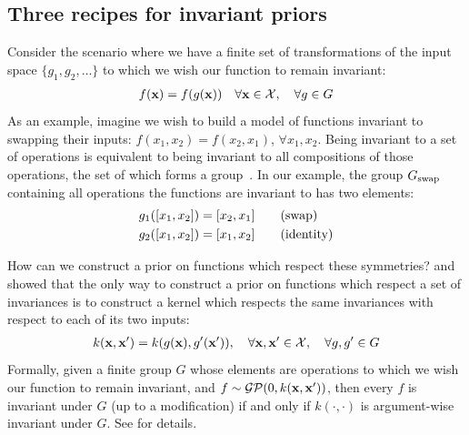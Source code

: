\subsection{Three recipes for invariant priors}

Consider the scenario where we have a finite set of transformations of the input space $\{g_1, g_2, \ldots \}$ to which we wish our function to remain invariant:
%
\begin{align}
f({\bf{x}}) = f(g({\bf{x}}))  \quad \forall {\bf{x}} \in \mathcal{X}, \quad \forall g \in G
\end{align}
%
As an example, imagine we wish to build a model of functions invariant to swapping their inputs: $f(x_1, x_2) = f(x_2, x_1)$, $\forall x_1,x_2$.
Being invariant to a set of operations is equivalent to being invariant to all compositions of those operations, the set of which forms a group~\citep[chapter 21]{armstrong1988groups}.
In our example, the group $G_\textnormal{swap}$ containing all operations the functions are invariant to has two elements:%
%
\begin{align}
g_1([x_1, x_2]) & = [x_2, x_1] \qquad \textnormal{(swap)} \\
g_2([x_1, x_2]) & = [x_1, x_2] \qquad \textnormal{(identity)}
\end{align}


How can we construct a prior on functions which respect these symmetries?
\citet{ginsbourger2012argumentwise} and \citet{Invariances13} showed that the only way to construct a \gp{} prior on functions which respect a set of invariances is to construct a kernel which respects the same invariances with respect to each of its two inputs:
%
\begin{align}
k({\bf{x}}, {\bf{x}}') = k( g({\bf{x}}), g'({\bf{x}}')), \quad \forall {\bf{x}}, {\bf{x}}' \in \mathcal{X}, \quad \forall g, g' \in G
\end{align}
%
Formally, given a finite group $G$ whose elements are operations to which we wish our function to remain invariant, and $f \sim \mathcal{GP}\!\left(0,k({\bf{x}},{\bf{x}}')\right)$, then every $f$ is invariant under $G$ (up to a modification) if and only if $k(\cdot, \cdot)$ is argument-wise invariant under $G$.
See \citet{Invariances13} for details.

